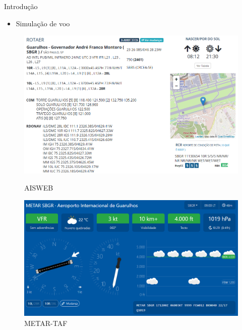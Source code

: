 \documentclass{beamer}
\begin{document}
\begin{frame}{Introdução}
    \begin{itemize}
        \item Simulação de voo
    \end{itemize}
    \begin{figure}[ht]
        \begin{minipage}[b]{0.45\linewidth}
            \centering
            \includegraphics[width=\textwidth]{img/aisweb.png}
            \caption{AISWEB}
        \end{minipage}
        \hspace{0.5cm}
        \pause
        \begin{minipage}[b]{0.45\linewidth}
            \centering
            \includegraphics[width=\textwidth]{img/metar-taf.png}
            \caption{METAR-TAF}
        \end{minipage}
    \end{figure}
\end{frame}
\end{document}
